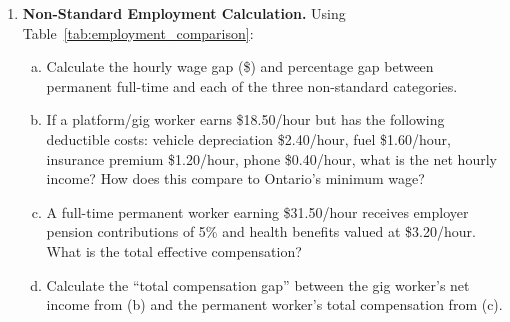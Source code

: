 \begin{enumerate}
\begin{enumerate}[(a)]
  \item Calculate the old-age dependency ratio for each year
        using Equation~\ref{eq:oadr}.
  \item If each retiree draws an average of \$25{,}000/year in
        OAS/GIS payments, calculate the total OAS/GIS cost in each year.
  \item If this cost is financed by a payroll tax split equally between
        workers and employers, calculate the implied tax rate (as a share
        of an average annual wage of \$65{,}000) in each year.
  \item What does this imply about the fiscal sustainability of Canada's
        public pension system and the potential need for immigration as
        an offset?
\end{enumerate}

\item \textbf{Non-Standard Employment Calculation.}
Using Table~\ref{tab:employment_comparison}:
\begin{enumerate}[(a)]
  \item Calculate the hourly wage gap (\$) and percentage gap between
        permanent full-time and each of the three non-standard categories.
  \item If a platform/gig worker earns \$18.50/hour but has the following
        deductible costs: vehicle depreciation \$2.40/hour, fuel
        \$1.60/hour, insurance premium \$1.20/hour, phone \$0.40/hour,
        what is the net hourly income? How does this compare to Ontario's
        minimum wage?
  \item A full-time permanent worker earning \$31.50/hour receives employer
        pension contributions of 5\% and health benefits valued at
        \$3.20/hour. What is the total effective compensation?
  \item Calculate the ``total compensation gap'' between the gig worker's
        net income from (b) and the permanent worker's total compensation
        from (c).
\end{enumerate}


\end{enumerate}
